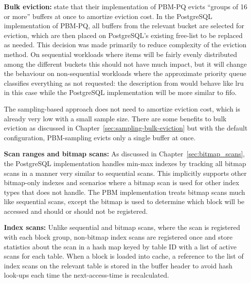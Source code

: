 \textbf{Bulk eviction:} \citet{pbm} state that their implementation of PBM-PQ evicts ``groups of 16 or more'' buffers at once to amortize eviction cost. In the PostgreSQL implementation of PBM-PQ, all buffers from the relevant bucket are selected for eviction, which are then placed on PostgreSQL's existing free-list to be replaced as needed. This decision was made primarily to reduce complexity of the eviction method. On sequential workloads where items will be fairly evenly distributed among the different buckets this should not have much impact, but it will change the behaviour on non-sequential workloads where the approximate priority queue classifies everything as not requested: the description from \cite{pbm} would behave like \gls{lru} in this case while the PostgreSQL implementation will be more similar to \gls{fifo}.

The sampling-based approach does not need to amortize eviction cost, which is already very low with a small sample size. There are some benefits to bulk eviction as discussed in Chapter~\ref{sec:sampling-bulk-eviction} but with the default configuration, PBM-sampling evicts only a single buffer at once.



\textbf{Scan ranges and bitmap scans:} As discussed in Chapter~\ref{sec:bitmap_scans}, the PostgreSQL implementation handles min-max indexes by tracking all bitmap scans in a manner very similar to sequential scans. This implicitly supports other bitmap-only indexes and scenarios where a bitmap scan is used for other index types that \cite{pbm} does not handle. The PBM implementation treats bitmap scans much like sequential scans, except the bitmap is used to determine which block will be accessed and should or should not be registered.


\textbf{Index scans:} Unlike sequential and bitmap scans, where the scan is registered with each block group, non-bitmap index scans are registered once and store statistics about the scan in a hash map keyed by table ID with a list of active scans for each table. When a block is loaded into cache, a reference to the list of index scans on the relevant table is stored in the buffer header to avoid hash look-ups each time the next-access-time is recalculated.


